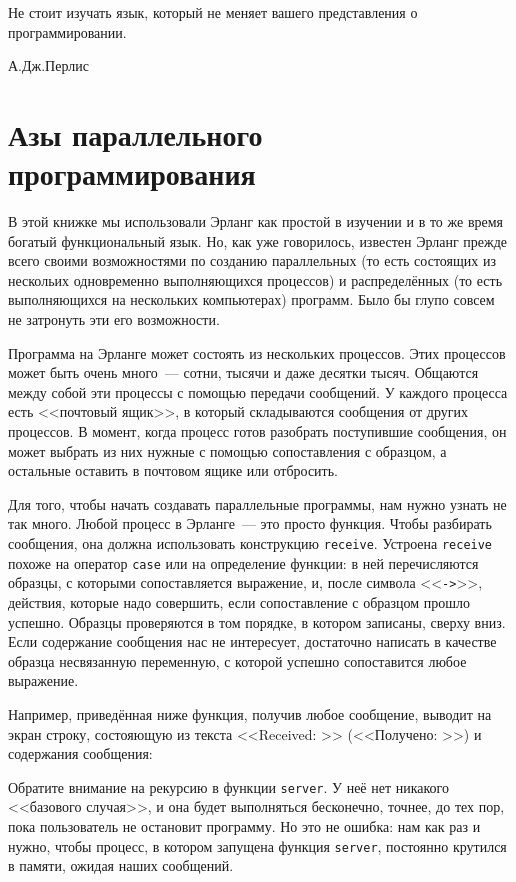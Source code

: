 \documentclass[
  paper=a4,
  fontsize=14pt,
  openany,
  appendixprefix=true
]{scrbook}
\begin{document}
\epigraph{Не стоит изучать язык, который не меняет вашего представления о программировании.}{А.Дж.Перлис}

\section{Азы параллельного программирования}

В этой книжке мы использовали Эрланг как простой в изучении и в то же время богатый функциональный язык. Но, как уже говорилось, известен Эрланг прежде всего своими возможностями по созданию параллельных (то есть состоящих из нескольих одновременно выполняющихся процессов)  и распределённых (то есть выполняющихся на нескольких компьютерах) программ. Было бы глупо совсем не затронуть эти его возможности.

Программа на Эрланге может состоять из нескольких процессов. Этих процессов может быть очень много~--- сотни, тысячи и даже десятки тысяч. Общаются между собой эти процессы с помощью передачи сообщений. У каждого процесса есть <<почтовый ящик>>, в который складываются сообщения от других процессов. В момент, когда процесс готов разобрать поступившие сообщения, он может выбрать из них нужные с помощью сопоставления с образцом, а остальные оставить в почтовом ящике или отбросить.

Для того, чтобы начать создавать параллельные программы, нам нужно узнать не так много. Любой процесс в Эрланге~--- это просто функция. Чтобы разбирать сообщения, она должна использовать конструкцию \lstinline{receive}. Устроена \lstinline{receive} похоже на оператор \lstinline{case} или на определение функции: в ней перечисляются образцы, с которыми сопоставляется выражение, и, после символа <<\lstinline{->}>>, действия, которые надо совершить, если сопоставление с образцом прошло успешно. Образцы проверяются в том порядке, в котором записаны, сверху вниз. Если содержание сообщения нас не интересует, достаточно написать в качестве образца несвязанную переменную, с которой успешно сопоставится любое выражение.

Например, приведённая ниже функция, получив любое сообщение, выводит на экран строку, состояющую из текста <<Received: >> (<<Получено: >>) и содержания сообщения:



Обратите внимание на рекурсию в функции \lstinline{server}. У неё нет никакого <<базового случая>>, и она будет выполняться бесконечно, точнее, до тех пор, пока пользователь не остановит программу. Но это не ошибка: нам как раз и нужно, чтобы процесс, в котором запущена функция \lstinline{server}, постоянно крутился в памяти, ожидая наших сообщений.
\end{document}
